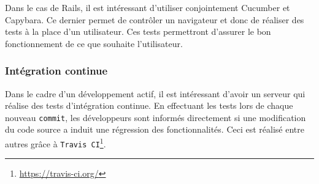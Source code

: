 Dans le cas de Rails, il est intéressant d'utiliser conjointement Cucumber et Capybara. Ce dernier permet de contrôler un navigateur et donc de réaliser des tests à la place d'un utilisateur. Ces tests permettront d'assurer le bon fonctionnement de ce que souhaite l'utilisateur.

\subsubsection{Intégration continue}
\label{travis}
Dans le cadre d'un développement actif, il est intéressant d'avoir un serveur qui réalise des tests d'intégration continue. En effectuant les tests lors de chaque nouveau \texttt{commit}, les développeurs sont informés directement si une modification du code source a induit une régression des fonctionnalités. Ceci est réalisé entre autres grâce à \texttt{Travis CI}\footnote{\url{https://travis-ci.org/}}.
